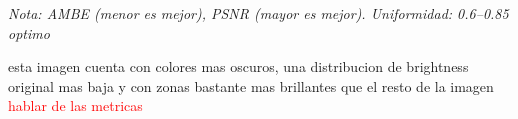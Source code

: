 \documentclass[sigchi]{acmart}
\newcommand{\rojo}[1]{\textcolor{red}{#1}}
\begin{document}
\begin{table}[H]
	\centering
	\caption{Métricas de calidad para la imagen 2015\_00026.jpg}
	\label{tab:metricas_2015_00026}
	\vspace{0.5em}


	\vspace{0.5em}
	\footnotesize%
	\textit{Nota: AMBE (menor es mejor), PSNR (mayor es mejor). Uniformidad: 0.6–0.85 optimo}
\end{table}

esta imagen cuenta con colores mas oscuros, una distribucion de brightness original mas baja y
con zonas bastante mas brillantes que el resto de la imagen
\rojo{hablar de las metricas}
\end{document}
